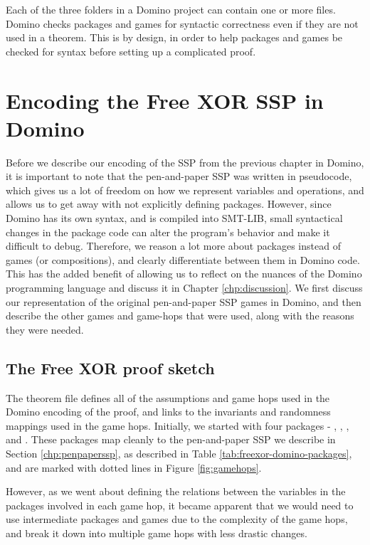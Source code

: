 Each of the three folders in a Domino project can contain one or more  files. Domino checks packages and games for syntactic correctness even if they are not used in a theorem. This is by design, in order to help packages and games  be checked for syntax before setting up a complicated proof.

\section{Encoding the Free XOR SSP in Domino}
\label{sec:freexorindomino}
Before we describe our encoding of the SSP from the previous chapter in Domino, it is important to note that the pen-and-paper SSP was written in pseudocode, which gives us a lot of freedom on how we represent variables and operations, and allows us to get away with not explicitly defining packages. However, since Domino has its own syntax, and is compiled into SMT-LIB, small syntactical changes in the package code can alter the program's behavior and make it difficult to debug. Therefore, we reason a lot more about packages instead of games (or compositions), and clearly differentiate between them in Domino code. This has the added benefit of allowing us to reflect on the nuances of the Domino programming language and discuss it in Chapter \ref{chp:discussion}. We first discuss our representation of the original pen-and-paper SSP games in Domino, and then describe the other games and game-hops that were used, along with the reasons they were needed. 

\subsection{The Free XOR proof sketch}
\label{subsec:freexorproofsketch}
The theorem file  defines all of the assumptions and game hops used in the Domino encoding of the proof, and links to the invariants and randomness mappings used in the game hops. Initially, we started with four packages - , , , and . These packages map cleanly to the pen-and-paper SSP we describe in Section \ref{chp:penpaperssp}, as described in Table \ref{tab:freexor-domino-packages}, and are marked with dotted lines in Figure \ref{fig:gamehops}.



However, as we went about defining the relations between the variables in the packages involved in each game hop, it became apparent that we would need to use intermediate packages and games due to the complexity of the game hops, and break it down into multiple game hops with less drastic changes.

